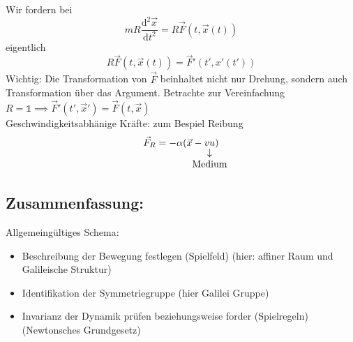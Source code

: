 \documentclass[a4paper]{scrartcl}
\renewcommand{\d}{\mathrm{d}}
\renewcommand{\v}[1]{\vec{#1}}
\theoremstyle{definition}
\theoremstyle{plain}
\theoremstyle{remark}
\theoremstyle{remark}
\begin{document}
Wir fordern bei
\[m R \frac{\d^2 \v x}{\d t^2} = R\v F(t,\v x(t))\]
eigentlich
\[R\v F(t,\v x(t)) = \v F'(t', x'(t'))\]
Wichtig: Die Transformation von $\v F$ beinhaltet nicht nur Drehung, sondern auch Transformation über das Argument.
Betrachte zur Vereinfachung $R = \mathbb{1} \implies \v F'(t', \v x') = \v F(t, \v x)$ \\

Geschwindigkeitsabhänige Kräfte: zum Bespiel Reibung
\[\v F_R = -\alpha(\v x - \underarrow[v u]{Medium})\]
\subsection{Zusammenfassung:}
\label{sec-6-8}
Allgemeingültiges Schema:
\begin{itemize}
\item Beschreibung der Bewegung festlegen (Spielfeld) (hier: affiner Raum und Galileische Struktur)
\item Identifikation der Symmetriegruppe (hier Galilei Gruppe)
\item Invarianz der Dynamik prüfen beziehungsweise forder (Spielregeln) (Newtonsches Grundgesetz)
\end{itemize}
\end{document}
